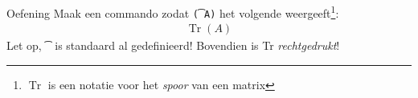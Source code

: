 \begin{frame}[fragile]{Oefening}
    Maak een commando zodat \texttt{\t(A)} het volgende 
    weergeeft\footnote{$\operatorname{Tr}$ is een notatie voor het \emph{spoor} van een matrix}:
    \begin{align*}
        \operatorname{Tr}(A)
    \end{align*}
    Let op, \texttt{\t} is standaard al gedefinieerd! Bovendien is Tr \emph{rechtgedrukt}!
    \pause 
    \begin{tcolorbox}[colback=white, colframe=green!70!black,title={Antwoord}]
        \texttt{\renewcommand{\t}{\operatorname{Tr}}}
    \end{tcolorbox}
\end{frame}